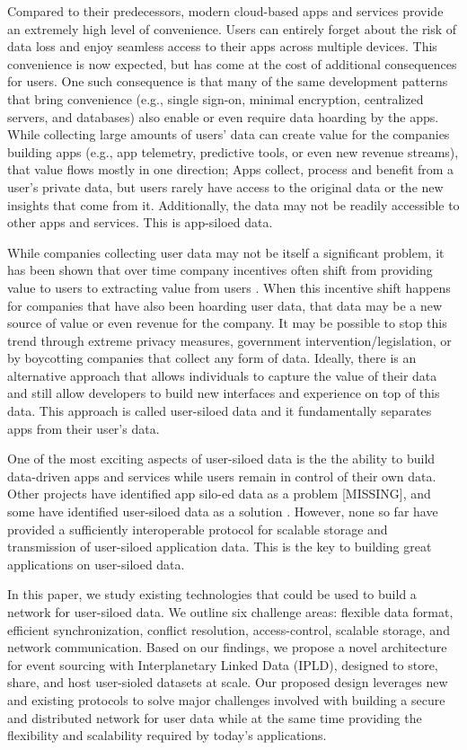 \documentclass{textile}
\begin{document}
Compared to their predecessors, modern cloud-based apps and services provide an extremely high level of convenience. Users can entirely forget about the risk of data loss and enjoy seamless access to their apps across multiple devices. This convenience is now expected, but has come at the cost of additional consequences for users. One such consequence is that many of the same development patterns that bring convenience (e.g., single sign-on, minimal encryption, centralized servers, and databases) also enable or even require data hoarding by the apps. While collecting large amounts of users' data can create value for the companies building apps (e.g., app telemetry, predictive tools, or even new revenue streams), that value flows mostly in one direction; Apps collect, process and benefit from a user's private data, but users rarely have access to the original data or the new insights that come from it. Additionally,  the data may not be readily accessible to other apps and services. This is app-siloed data.

While companies collecting user data may not be itself a significant problem, it has been shown that over time company incentives often shift from providing value to users to extracting value from users \cite{dixonWhyDecentralizationMatters2018}. When this incentive shift happens for companies that have also been hoarding user data, that data may be a new source of value or even revenue for the company. It may be possible to stop this trend through extreme privacy measures, government intervention/legislation, or by boycotting companies that collect any form of data. Ideally, there is an alternative approach that allows individuals to capture the value of their data and still allow developers to build new interfaces and experience on top of this data. This approach is called user-siloed data and it fundamentally separates apps from their user's data.

One of the most exciting aspects of user-siloed data is the the ability to build data-driven apps and services while users remain in control of their own data. Other projects have identified app silo-ed data as a problem [MISSING], and some have identified user-siloed data as a solution \cite{sambraSolidPlatformDecentralized2016}. However, none so far have provided a sufficiently interoperable protocol for scalable storage and transmission of user-siloed application data. This is the key to building great applications on user-siloed data.

In this paper, we study existing technologies that could be used to build a network for user-siloed data. We outline six challenge areas: flexible data format, efficient synchronization, conflict resolution, access-control, scalable storage, and network communication. Based on our findings, we propose a novel architecture for event sourcing with Interplanetary Linked Data (IPLD), designed to store, share, and host user-sioled datasets at scale. Our proposed design leverages new and existing protocols to solve major challenges involved with building a secure and distributed network for user data while at the same time providing the flexibility and scalability required by today's applications. 
\end{document}
